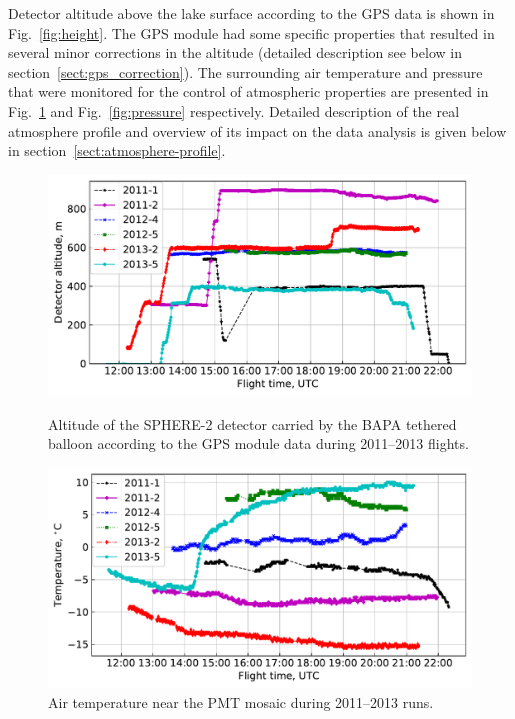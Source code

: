 \documentclass[preprint,5p,times]{elsarticle}
\begin{document}
Detector altitude above the lake surface according to the GPS data is shown in Fig.~\ref{fig:height}. The GPS module had some specific properties that resulted in several minor corrections in the altitude (detailed description see below in section~\ref{sect:gps_correction}). The surrounding air temperature and pressure that were monitored for the control of atmospheric properties are presented in Fig.~\ref{fig:temperature} and Fig.~\ref{fig:pressure} respectively. Detailed description of the real atmosphere profile and overview of its impact on the data analysis is given below in section~\ref{sect:atmosphere-profile}.

\begin{figure}[thb]    
    \begin{minipage}[t]{0.48\textwidth}
    \centering
 \includegraphics[width=\textwidth]{Telemetry_height.pdf}
    \caption{Altitude of the SPHERE-2 detector carried by the BAPA tethered balloon according to the GPS module data during 2011--2013 flights.}
    \label{fig:height}
    
    \end{minipage}
    \hfill
    \begin{minipage}[t]{0.48\textwidth}
    \centering
\includegraphics[width=\textwidth]{Telemetry_tmos.pdf}
    \caption{Air temperature near the PMT mosaic during 2011--2013 runs.}
    \label{fig:temperature}
    
    \end{minipage}
\end{figure}
\end{document}
